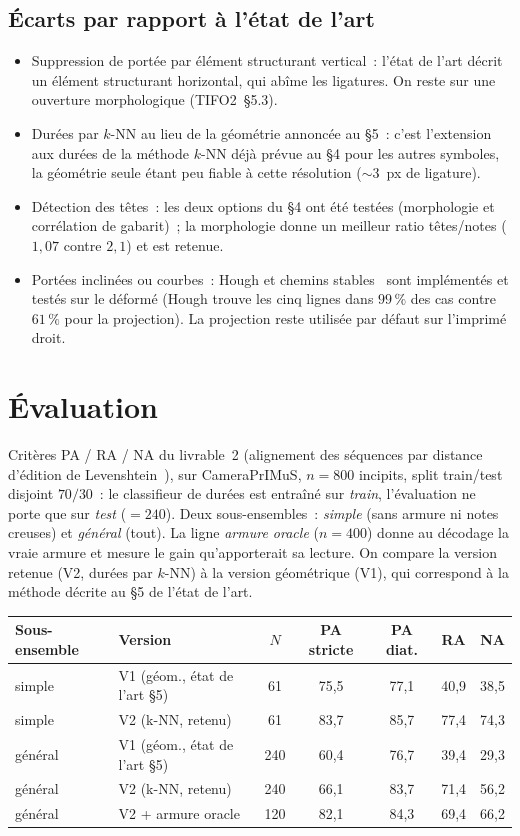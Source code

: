 \documentclass[11pt,a4paper]{article}
\begin{document}
\subsection{Écarts par rapport à l'état de l'art}
\begin{itemize}
\item Suppression de portée par élément structurant vertical~: l'état de l'art décrit un élément structurant
horizontal, qui
abîme les ligatures. On reste sur une ouverture morphologique (TIFO2~§5.3).
\item Durées par $k$-NN au lieu de la géométrie annoncée au §5~: c'est l'extension aux durées de la méthode
$k$-NN déjà prévue au §4 pour les autres symboles, la géométrie seule étant peu fiable à cette résolution
($\sim$3~px de ligature).
\item Détection des têtes~: les deux options du §4 ont été testées (morphologie et corrélation de gabarit)~; la
morphologie donne un meilleur ratio têtes/notes ($1{,}07$ contre $2{,}1$) et est retenue.
\item Portées inclinées ou courbes~: Hough et chemins stables~\cite{cardoso2009} sont implémentés et testés sur
le déformé (Hough trouve les cinq lignes dans $99\,\%$ des cas contre $61\,\%$ pour la projection). La
projection reste utilisée par défaut sur l'imprimé droit.
\end{itemize}

\section{Évaluation}
Critères PA / RA / NA du livrable~2 (alignement des séquences par distance d'édition de
Levenshtein~\cite{levenshtein1966}), sur CameraPrIMuS, $n=800$ incipits, split train/test disjoint $70/30$~: le
classifieur de durées est entraîné sur \emph{train}, l'évaluation ne porte que sur \emph{test} ($=240$). Deux
sous-ensembles~: \emph{simple} (sans armure ni notes creuses) et \emph{général} (tout). La ligne \emph{armure
oracle} ($n=400$) donne au décodage la vraie armure et mesure le gain qu'apporterait sa lecture. On compare la
version retenue (V2, durées par $k$-NN) à la version géométrique (V1), qui correspond à la méthode décrite au §5
de l'état de l'art.

\begin{center}\small
\begin{tabular}{llccccc}
\toprule
Sous-ensemble & Version & $N$ & PA stricte & PA diat. & RA & NA \\
\midrule
simple  & V1 (géom., état de l'art §5) & 61  & 75{,}5 & 77{,}1 & 40{,}9 & 38{,}5 \\
simple  & V2 (k-NN, retenu) & 61  & 83{,}7 & 85{,}7 & 77{,}4 & 74{,}3 \\
général & V1 (géom., état de l'art §5) & 240 & 60{,}4 & 76{,}7 & 39{,}4 & 29{,}3 \\
général & V2 (k-NN, retenu) & 240 & 66{,}1 & 83{,}7 & 71{,}4 & 56{,}2 \\
général & V2 + armure oracle & 120 & 82{,}1 & 84{,}3 & 69{,}4 & 66{,}2 \\
\bottomrule
\end{tabular}
\end{center}
\end{document}
